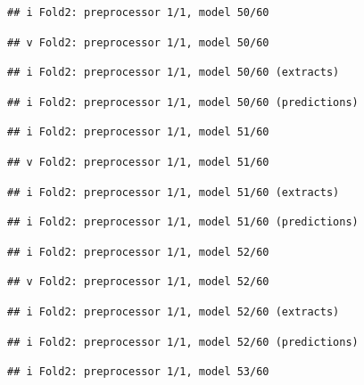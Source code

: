 \documentclass[
]{article}
\begin{document}
\begin{verbatim}
## i Fold2: preprocessor 1/1, model 50/60
\end{verbatim}

\begin{verbatim}
## v Fold2: preprocessor 1/1, model 50/60
\end{verbatim}

\begin{verbatim}
## i Fold2: preprocessor 1/1, model 50/60 (extracts)
\end{verbatim}

\begin{verbatim}
## i Fold2: preprocessor 1/1, model 50/60 (predictions)
\end{verbatim}

\begin{verbatim}
## i Fold2: preprocessor 1/1, model 51/60
\end{verbatim}

\begin{verbatim}
## v Fold2: preprocessor 1/1, model 51/60
\end{verbatim}

\begin{verbatim}
## i Fold2: preprocessor 1/1, model 51/60 (extracts)
\end{verbatim}

\begin{verbatim}
## i Fold2: preprocessor 1/1, model 51/60 (predictions)
\end{verbatim}

\begin{verbatim}
## i Fold2: preprocessor 1/1, model 52/60
\end{verbatim}

\begin{verbatim}
## v Fold2: preprocessor 1/1, model 52/60
\end{verbatim}

\begin{verbatim}
## i Fold2: preprocessor 1/1, model 52/60 (extracts)
\end{verbatim}

\begin{verbatim}
## i Fold2: preprocessor 1/1, model 52/60 (predictions)
\end{verbatim}

\begin{verbatim}
## i Fold2: preprocessor 1/1, model 53/60
\end{verbatim}
\end{document}
